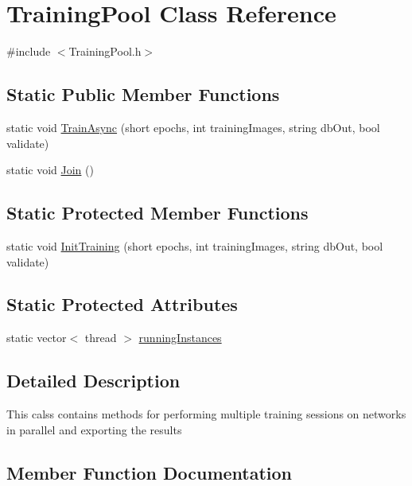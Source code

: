 \hypertarget{class_training_pool}{}\section{Training\+Pool Class Reference}
\label{class_training_pool}


{\ttfamily \#include $<$Training\+Pool.\+h$>$}

\subsection*{Static Public Member Functions}
\begin{DoxyCompactItemize}
\item 
static void \mbox{\hyperlink{class_training_pool_ac643df39b60542b4c67062098b57eb2c}{Train\+Async}} (short epochs, int training\+Images, string db\+Out, bool validate)
\item 
static void \mbox{\hyperlink{class_training_pool_aa75f6b22ac7ea9a2b4c35c959a15db4e}{Join}} ()
\end{DoxyCompactItemize}
\subsection*{Static Protected Member Functions}
\begin{DoxyCompactItemize}
\item 
static void \mbox{\hyperlink{class_training_pool_a2304f92096432a3b9ae46ad7dcb1cb34}{Init\+Training}} (short epochs, int training\+Images, string db\+Out, bool validate)
\end{DoxyCompactItemize}
\subsection*{Static Protected Attributes}
\begin{DoxyCompactItemize}
\item 
static vector$<$ thread $>$ \mbox{\hyperlink{class_training_pool_a48f6b4fca84ea906358d0491ed9aa866}{running\+Instances}}
\end{DoxyCompactItemize}


\subsection{Detailed Description}
This calss contains methods for performing multiple training sessions on networks in parallel and exporting the results 

\subsection{Member Function Documentation}
\mbox{\label{class_training_pool_a2304f92096432a3b9ae46ad7dcb1cb34}} 
